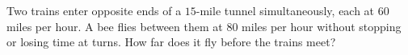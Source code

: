 Two trains enter opposite ends of a $15$-mile tunnel simultaneously, each at $60$ miles per hour. A bee flies between them at $80$ miles per hour without stopping or losing time at turns. How far does it fly before the trains meet?
